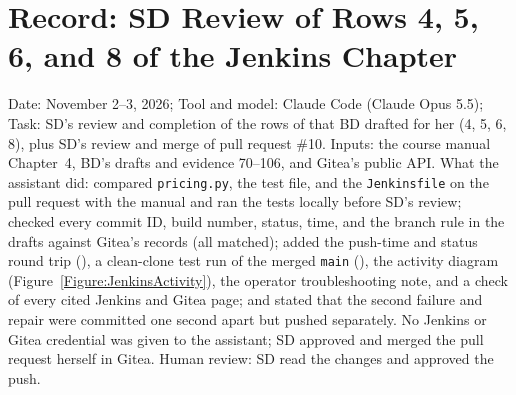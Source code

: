 \section{Record: SD Review of Rows 4, 5, 6, and 8 of the Jenkins Chapter}
Date: November 2--3, 2026; Tool and model: Claude Code (Claude Opus 5.5);
Task: SD's review and completion of the rows of  that BD drafted for her (4, 5, 6, 8), plus SD's review and
merge of pull request \#10. Inputs: the course manual \cite{DosManual} Chapter~4, BD's drafts and evidence 70--106, and Gitea's public
API. What the assistant did: compared \texttt{pricing.py}, the test file, and the \texttt{Jenkinsfile} on the pull request with the
manual and ran the tests locally before SD's review; checked every commit ID, build number, status, time, and the branch rule in the
drafts against Gitea's records (all matched); added the push-time and status round trip (), a clean-clone test run of the
merged \texttt{main} (), the activity diagram (Figure~\ref{Figure:JenkinsActivity}), the operator troubleshooting note, and a
check of every cited Jenkins and Gitea page; and stated that the second failure and repair were committed one second apart but pushed
separately. No Jenkins or Gitea credential was given to the assistant; SD approved and merged the pull request herself in Gitea.
Human review: SD read the changes and approved the push.

